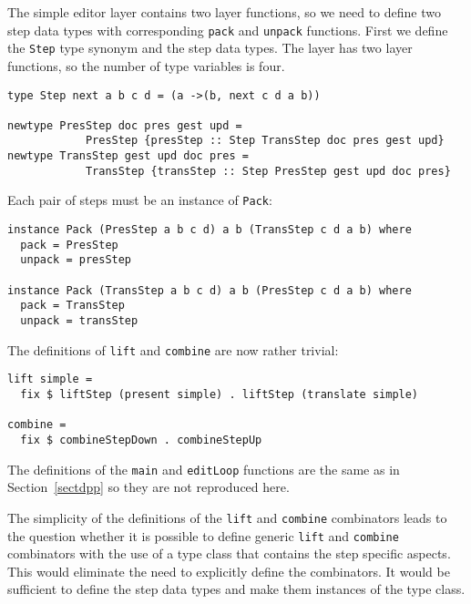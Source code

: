 The simple editor layer contains two layer functions, so we need to define two step data types with corresponding \texttt{pack} and \texttt{unpack} functions. First we define the \texttt{Step} type synonym and the step data types. The layer has two layer functions, so the number of type variables is four.

\begin{small}
\begin{verbatim}
type Step next a b c d = (a ->(b, next c d a b))

newtype PresStep doc pres gest upd = 
            PresStep {presStep :: Step TransStep doc pres gest upd}
newtype TransStep gest upd doc pres = 
            TransStep {transStep :: Step PresStep gest upd doc pres}
\end{verbatim}
\end{small}

Each pair of steps must be an instance of \texttt{Pack}: 

\begin{small}
\begin{verbatim}
instance Pack (PresStep a b c d) a b (TransStep c d a b) where
  pack = PresStep
  unpack = presStep

instance Pack (TransStep a b c d) a b (PresStep c d a b) where
  pack = TransStep
  unpack = transStep
\end{verbatim}
\end{small}

The definitions of \texttt{lift} and \texttt{combine} are now rather trivial:

\begin{small}
\begin{verbatim}
lift simple =
  fix $ liftStep (present simple) . liftStep (translate simple)

combine = 
  fix $ combineStepDown . combineStepUp
\end{verbatim}
\end{small}

The definitions of the \texttt{main} and \texttt{editLoop} functions are the same as in Section~\ref{sectdpp} so they are not reproduced here.



The simplicity of the definitions of the \texttt{lift} and \texttt{combine} combinators leads to the question whether it is possible to define generic \texttt{lift} and \texttt{combine} combinators with the use of a type class that contains the step specific aspects. This would eliminate the need to explicitly define the combinators. It would be sufficient to define the step data types and make them instances of the type class. 

